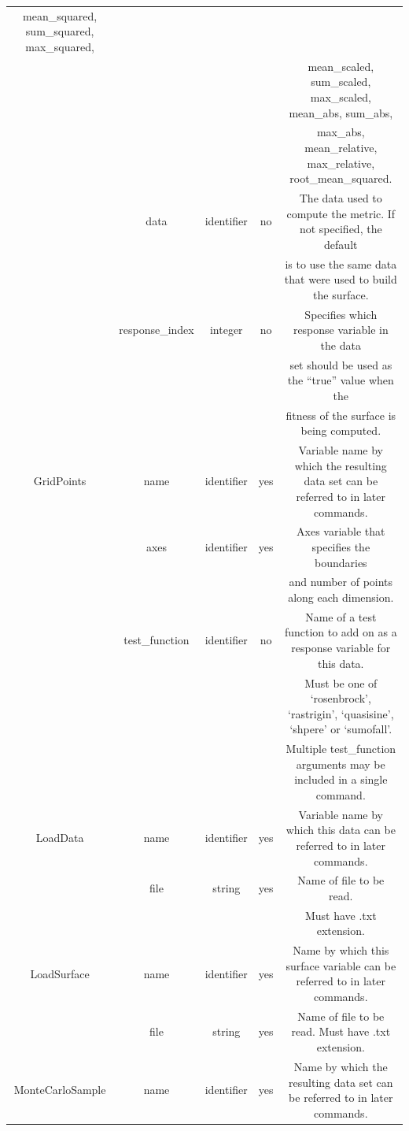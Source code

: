 \documentclass{article}
\begin{document}
\begin{table}
\begin{tabular}{|c|c|c|c|c|}
    mean\_squared, sum\_squared, max\_squared, \\ 
    & & & & mean\_scaled, sum\_scaled, max\_scaled, mean\_abs, sum\_abs, \\
    & & & & max\_abs, mean\_relative, max\_relative, root\_mean\_squared.\\
    \hline
    & data & identifier & no & The data used to compute the metric.
    If not specified, the default\\
    & & & & is to use the same data that were used to build the
    surface.\\
    \hline
    & response\_index & integer & no & Specifies which response
    variable in the data\\ & & & & set should be used as the ``true'' value when the\\
    & & & & fitness of the surface is being computed.\\
    \hline
    GridPoints & name & identifier & yes & Variable name by which the
    resulting data set can be referred to in later commands.\\
    \hline
    & axes & identifier & yes & Axes variable that specifies the
    boundaries\\
    & & & & and number of points along each dimension.\\
    \hline
    & test\_function & identifier & no & Name of a test function to add on
    as a response variable for this data.\\
    & & & & Must be one of `rosenbrock', `rastrigin', `quasisine',
    `shpere' or `sumofall'.\\
    & & & & Multiple test\_function arguments may be included in a
    single command.\\
    \hline
    LoadData & name & identifier & yes & Variable name by which this
    data can be referred to in later commands.\\
    \hline
    & file & string & yes & Name of file to be read.\\
    & & & & Must have .txt extension.\\
    \hline
    LoadSurface & name & identifier & yes & Name by which
    this surface variable can be referred to in later commands.\\
    \hline
    & file & string & yes & Name of file to be read.  Must have .txt
    extension.\\
    \hline
    MonteCarloSample & name & identifier & yes & Name by
    which the resulting data set can be referred to in later commands.\\

\end{tabular}
\end{table}
\end{document}
